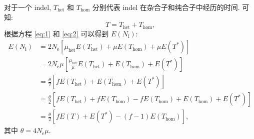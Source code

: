 \documentclass[12pt]{article}
\begin{document}
对于一个 indel, $T_\text{het}$ 和 $T_\text{hom}$ 分别代表 indel 在杂合子和纯合子中经历的时间. 可知:
\begin{equation} \label{eq:2}
    T = T_\text{het} + T_\text{hom}
    \text{,}
\end{equation}
根据方程 \ref{eq:1} 和 \ref{eq:2} 可以得到 $E(N_\text{i})$:
\begin{equation} \label{eq:3}
    \begin{split}
        E(N_\text{i})
        &= 2 N_\text{e} [\mu_\text{het}E(T_{\text{het}}) + \mu E(T_{\text{hom}}) + \mu E(T^*)] \\
        &= 2 N_\text{e}\mu [\frac{\mu_\text{het}}{\mu} E(T_{\text{het}}) + E(T_{\text{hom}}) + E(T^*)] \\
        &= \frac{\theta}{2} [f E(T_{\text{het}}) + E(T_{\text{hom}}) + E(T^*)] \\
        &= \frac{\theta}{2} [f E(T_{\text{het}}) + f E(T_{\text{hom}}) - f E(T_{\text{hom}}) + E(T_{\text{hom}}) + E(T^*)] \\
        &= \frac{\theta}{2} [f E(T) + E(T^*) - (f - 1) E(T_{\text{hom}})]
        \text{,}
    \end{split}
\end{equation}
其中 $\theta = 4N_\text{e}\mu$.
\end{document}
